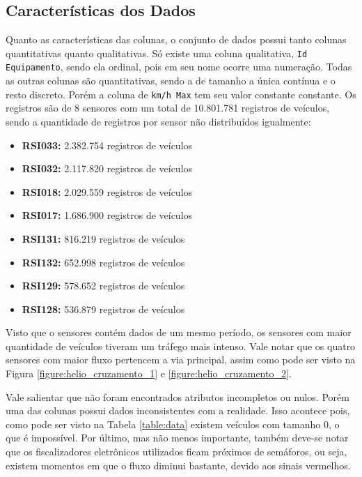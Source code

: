 \subsection{Características dos Dados}

Quanto as características das colunas, o conjunto de dados possui tanto colunas quantitativas quanto qualitativas. Só existe uma coluna qualitativa, \texttt{Id Equipamento}, sendo ela ordinal, pois em seu nome ocorre uma numeração. Todas as outras colunas são quantitativas, sendo a de tamanho a única contínua e o resto discreto. Porém a coluna de \texttt{km/h Max} tem seu valor constante constante.  Os registros são de 8 sensores com um total de 10.801.781 registros de veículos, sendo a quantidade de registros por sensor não distribuídos igualmente:

\begin{itemize}
    \item \textbf{RSI033:} 2.382.754 registros de veículos
    \item \textbf{RSI032:} 2.117.820 registros de veículos
    \item \textbf{RSI018:} 2.029.559 registros de veículos
    \item \textbf{RSI017:} 1.686.900 registros de veículos
    \item \textbf{RSI131:} 816.219 registros de veículos
    \item \textbf{RSI132:} 652.998 registros de veículos
    \item \textbf{RSI129:} 578.652 registros de veículos
    \item \textbf{RSI128:} 536.879 registros de veículos
\end{itemize}


Visto que o sensores contém dados de um mesmo período, os sensores com maior quantidade de veículos tiveram um tráfego mais intenso. Vale notar que os quatro sensores com maior fluxo pertencem a via principal, assim como pode ser visto na Figura \ref{figure:helio_cruzamento_1} e \ref{figure:helio_cruzamento_2}.

Vale salientar que não foram encontrados atributos incompletos ou nulos. Porém uma das colunas possui dados inconsistentes com a realidade. Isso acontece pois, como pode ser visto na Tabela \ref{table:data} existem veículos com tamanho 0, o que é impossível. Por último, mas não menos importante, também deve-se notar que os fiscalizadores eletrônicos utilizados ficam próximos de semáforos, ou seja, existem momentos em que o fluxo diminui bastante, devido aos sinais vermelhos. 

